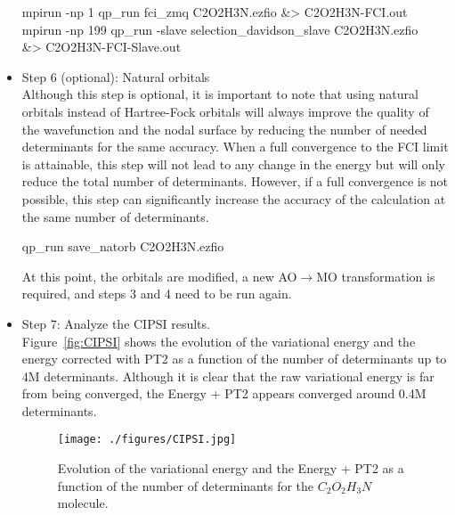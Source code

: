 \begin{itemize}
\begin{shade}
mpirun -np 1 qp_run fci_zmq C2O2H3N.ezfio &> C2O2H3N-FCI.out 
mpirun -np 199 qp_run -slave selection_davidson_slave C2O2H3N.ezfio\\
&> C2O2H3N-FCI-Slave.out 
\end{shade}

\item Step 6 (optional): Natural orbitals \\
Although this step is optional, it is important to note that using natural orbitals instead of Hartree-Fock orbitals will always improve the quality of the wavefunction and the nodal surface by reducing the number of needed determinants for the same accuracy. When a full convergence to the FCI limit is attainable, this step will not lead to any change in the energy but will only reduce the total number of determinants. However, if a full convergence is not possible, this step can significantly increase the accuracy of the calculation at the same number of determinants. 

\begin{shade}
qp_run save_natorb C2O2H3N.ezfio  
\end{shade}
\hfill
At this point, the orbitals are modified, a new AO$\rightarrow$MO transformation is required, and steps 3 and 4 need to be run again.

\item Step 7: Analyze the CIPSI results.\\
Figure~\ref{fig:CIPSI} shows the evolution of the variational energy and the energy corrected with PT2 as a function of the number of determinants up to 4M determinants. Although it is clear that the raw variational energy is far from being converged, the Energy + PT2 appears converged around 0.4M determinants.

\begin{figure}
\begin{center}
\texttt{[image: ./figures/CIPSI.jpg]}
\end{center}
\caption{Evolution of the variational energy and the Energy + PT2 as a function of the number of determinants for the $C_2O_2H_3N$ molecule.}
\protect{\label{fig:CIPSI}}
\end{figure}






\end{itemize}
